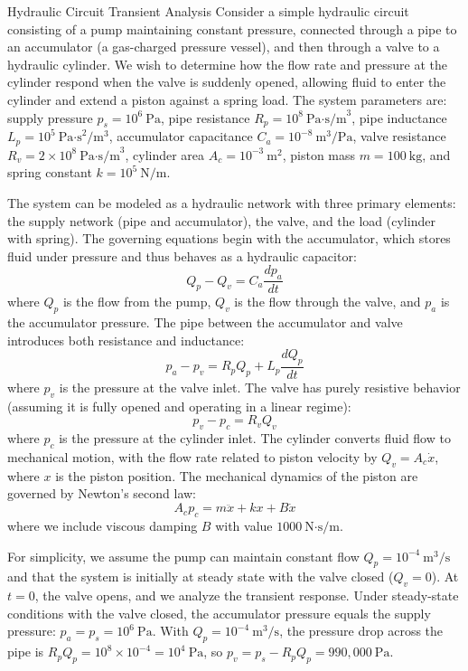 \begin{example}{Hydraulic Circuit Transient Analysis}
Consider a simple hydraulic circuit consisting of a pump maintaining constant pressure, connected through a pipe to an accumulator (a gas-charged pressure vessel), and then through a valve to a hydraulic cylinder. We wish to determine how the flow rate and pressure at the cylinder respond when the valve is suddenly opened, allowing fluid to enter the cylinder and extend a piston against a spring load. The system parameters are: supply pressure $p_s = 10^6\ \text{Pa}$, pipe resistance $R_p = 10^8\ \text{Pa·s/m}^3$, pipe inductance $L_p = 10^5\ \text{Pa·s}^2/\text{m}^3$, accumulator capacitance $C_a = 10^{-8}\ \text{m}^3/\text{Pa}$, valve resistance $R_v = 2 \times 10^8\ \text{Pa·s/m}^3$, cylinder area $A_c = 10^{-3}\ \text{m}^2$, piston mass $m = 100\ \text{kg}$, and spring constant $k = 10^5\ \text{N/m}$.

The system can be modeled as a hydraulic network with three primary elements: the supply network (pipe and accumulator), the valve, and the load (cylinder with spring). The governing equations begin with the accumulator, which stores fluid under pressure and thus behaves as a hydraulic capacitor:
\begin{equation}
Q_p - Q_v = C_a \frac{dp_a}{dt}
\end{equation}
where $Q_p$ is the flow from the pump, $Q_v$ is the flow through the valve, and $p_a$ is the accumulator pressure. The pipe between the accumulator and valve introduces both resistance and inductance:
\begin{equation}
p_a - p_v = R_p Q_p + L_p \frac{dQ_p}{dt}
\end{equation}
where $p_v$ is the pressure at the valve inlet. The valve has purely resistive behavior (assuming it is fully opened and operating in a linear regime):
\begin{equation}
p_v - p_c = R_v Q_v
\end{equation}
where $p_c$ is the pressure at the cylinder inlet. The cylinder converts fluid flow to mechanical motion, with the flow rate related to piston velocity by $Q_v = A_c \dot{x}$, where $x$ is the piston position. The mechanical dynamics of the piston are governed by Newton's second law:
\begin{equation}
A_c p_c = m \ddot{x} + kx + B \dot{x}
\end{equation}
where we include viscous damping $B$ with value $1000\ \text{N·s/m}$.

For simplicity, we assume the pump can maintain constant flow $Q_p = 10^{-4}\ \text{m}^3/\text{s}$ and that the system is initially at steady state with the valve closed ($Q_v = 0$). At $t = 0$, the valve opens, and we analyze the transient response. Under steady-state conditions with the valve closed, the accumulator pressure equals the supply pressure: $p_a = p_s = 10^6\ \text{Pa}$. With $Q_p = 10^{-4}\ \text{m}^3/\text{s}$, the pressure drop across the pipe is $R_p Q_p = 10^8 \times 10^{-4} = 10^4\ \text{Pa}$, so $p_v = p_s - R_p Q_p = 990,000\ \text{Pa}$.


\end{example}

